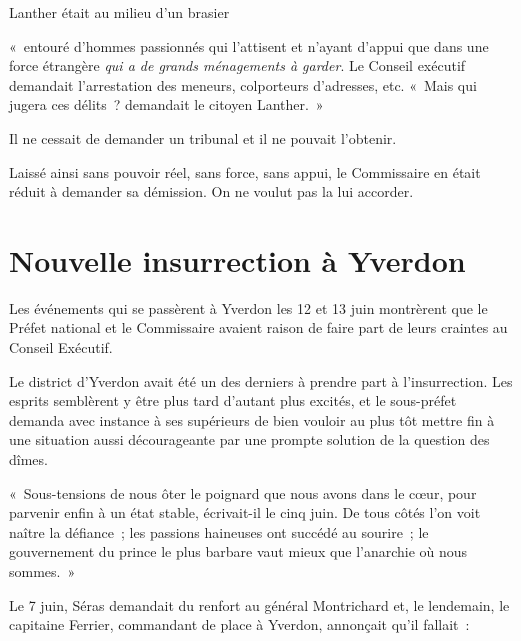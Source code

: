\documentclass[french,twoside]{book} %
\newenvironment{quoteblock}%
  {\begin{quoting}}
  {\end{quoting}}
\newenvironment{quotebar}{%
    \def\FrameCommand{{\color{rubric!10!}\vrule width 0.5em} \hspace{0.9em}}%
    \def\OuterFrameSep{\itemsep} %
    \MakeFramed {\advance\hsize-\width \FrameRestore}
  }%
  {%
    \endMakeFramed
  }
\renewenvironment{quoteblock}%
  {%
    \savenotes
    \setstretch{0.9}
    \normalfont
    \begin{quotebar}
  }
  {%
    \end{quotebar}
    \spewnotes
  }
\begin{document}
\noindent Lanther était au milieu d’un brasier\par

\begin{quoteblock}
\noindent « entouré d’hommes passionnés qui l’attisent et n’ayant d’appui que dans une force étrangère \emph{qui a de grands ménagements à garder}. Le Conseil exécutif demandait l’arrestation des meneurs, colporteurs d’adresses, etc. « Mais qui jugera ces délits ? demandait le citoyen Lanther. »\end{quoteblock}

\noindent Il ne cessait de demander un tribunal et il ne pouvait l’obtenir.\par
Laissé ainsi sans pouvoir réel, sans force, sans appui, le Commissaire en était réduit à demander sa démission. On ne voulut pas la lui accorder.
\section[{Nouvelle insurrection à Yverdon}]{Nouvelle insurrection à Yverdon}
\noindent Les événements qui se passèrent à Yverdon les 12 et 13 juin montrèrent que le Préfet national et le Commissaire avaient raison de faire part de leurs craintes au Conseil Exécutif.\par
Le district d’Yverdon avait été un des derniers à prendre part à l’insurrection. Les esprits semblèrent y être plus tard d’autant plus excités, et le sous-préfet demanda avec instance à ses supérieurs de bien vouloir au plus tôt mettre fin à une situation aussi décourageante par une prompte solution de la question des dîmes.\par

\begin{quoteblock}
 \noindent  « Sous-tensions de nous ôter le poignard que nous avons dans le cœur, pour parvenir enfin à un état stable, écrivait-il le cinq juin. De tous côtés l’on voit naître la défiance ; les passions haineuses ont succédé au sourire ; le gouvernement du prince le plus barbare vaut mieux que l’anarchie où nous sommes. »
 \end{quoteblock}

\noindent Le 7 juin, Séras demandait du renfort au général Montrichard et, le lendemain, le capitaine Ferrier, commandant de place à Yverdon, annonçait qu’il fallait :\par
\end{document}
